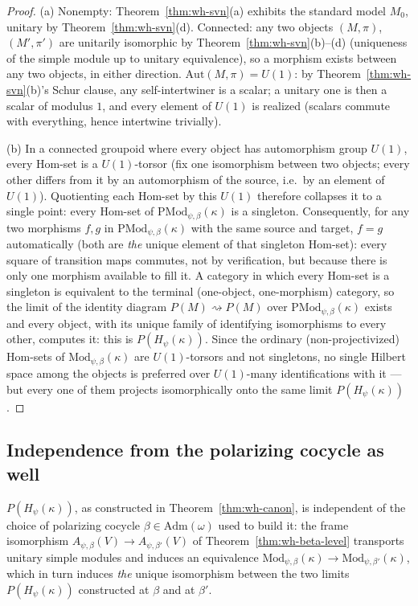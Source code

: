 \begin{proof}
(a) Nonempty: Theorem~\ref{thm:wh-svn}(a) exhibits the standard model
$M_0$, unitary by Theorem~\ref{thm:wh-svn}(d). Connected: any two objects
$(M,\pi)$, $(M',\pi')$ are unitarily isomorphic by
Theorem~\ref{thm:wh-svn}(b)--(d) (uniqueness of the simple module up to
unitary equivalence), so a morphism exists between any two objects, in
either direction. $\mathrm{Aut}(M,\pi)=U(1)$: by
Theorem~\ref{thm:wh-svn}(b)'s Schur clause, any self-intertwiner is a
scalar; a unitary one is then a scalar of modulus $1$, and every element of
$U(1)$ is realized (scalars commute with everything, hence intertwine
trivially).

(b) In a connected groupoid where every object has automorphism group
$U(1)$, every $\mathrm{Hom}$-set is a $U(1)$-torsor (fix one isomorphism
between two objects; every other differs from it by an automorphism of the
source, i.e.\ by an element of $U(1)$). Quotienting each $\mathrm{Hom}$-set
by this $U(1)$ therefore collapses it to a single point: every
$\mathrm{Hom}$-set of $\mathrm{PMod}_{\psi,\beta}(\kappa)$ is a singleton.
Consequently, for any two morphisms $f,g$ in $\mathrm{PMod}_{\psi,\beta}(\kappa)$
with the same source and target, $f=g$ automatically (both are \emph{the}
unique element of that singleton $\mathrm{Hom}$-set): every square of
transition maps commutes, not by verification, but because there is only
one morphism available to fill it. A category in which every $\mathrm{Hom}$-set
is a singleton is equivalent to the terminal (one-object, one-morphism)
category, so the limit of the identity diagram $P(M) \rightsquigarrow P(M)$
over $\mathrm{PMod}_{\psi,\beta}(\kappa)$ exists and every object, with its
unique family of identifying isomorphisms to every other, computes it: this
is $P(H_\psi(\kappa))$. Since the ordinary (non-projectivized) $\mathrm{Hom}$-sets
of $\mathrm{Mod}_{\psi,\beta}(\kappa)$ are $U(1)$-torsors and not
singletons, no single Hilbert space among the objects is preferred over
$U(1)$-many identifications with it — but every one of them projects
isomorphically onto the same limit $P(H_\psi(\kappa))$.
\end{proof}

\subsection{Independence from the polarizing cocycle as well}

\statusSketch
\begin{theorem}
\label{thm:wh-canon-beta}
$P(H_\psi(\kappa))$, as constructed in Theorem~\ref{thm:wh-canon}, is
independent of the choice of polarizing cocycle $\beta\in\mathrm{Adm}(\omega)$
used to build it: the frame isomorphism $A_{\psi,\beta}(V)\to A_{\psi,\beta'}(V)$
of Theorem~\ref{thm:wh-beta-level} transports unitary simple modules and
induces an equivalence $\mathrm{Mod}_{\psi,\beta}(\kappa)\to\mathrm{Mod}_{\psi,\beta'}(\kappa)$,
which in turn induces \emph{the} unique isomorphism between the two limits
$P(H_\psi(\kappa))$ constructed at $\beta$ and at $\beta'$.
\end{theorem}

